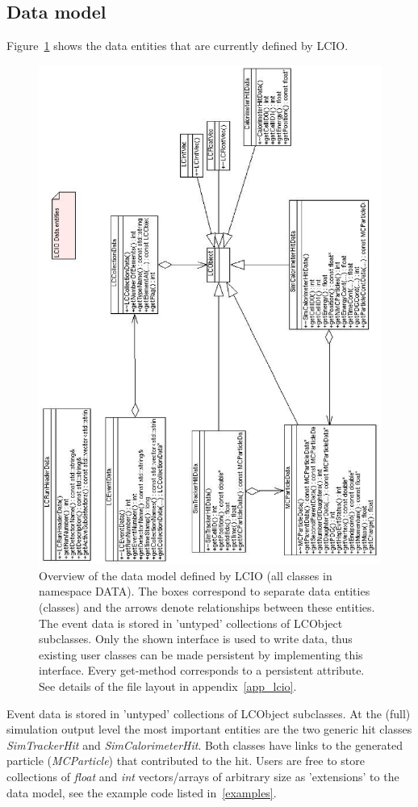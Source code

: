 \documentclass[twoside]{article}
\begin{document}
\subsection{Data model \label{sec_datamodel}}

Figure~\ref{fig_datamodel} shows the data entities that are currently defined by LCIO. 
\begin{figure}
\includegraphics[width=150mm]{datamodel.eps}
\caption{Overview of the data model defined by LCIO (all classes in namespace DATA). 
The boxes correspond to separate
data entities (classes) and the arrows denote relationships between these entities.
The event data is stored in 'untyped' collections of LCObject subclasses.
Only the shown interface is used to write data, thus existing user classes can be made persistent 
by implementing this interface.  Every get-method
corresponds to a persistent attribute. 
See details of the file layout in appendix~\ref{app_lcio}.\label{fig_datamodel}}

\end{figure}
Event data is stored in 'untyped' collections of LCObject subclasses. At the (full) simulation
output level the most important entities are the two generic hit classes {\em SimTrackerHit} and 
{\em SimCalorimeterHit}. Both classes have links to the generated particle ({\em MCParticle}) that 
contributed to the hit.
Users are free to store collections of {\em float} and {\em int} vectors/arrays of arbitrary size
as 'extensions' to the data model, see the example code listed in~\ref{examples}.
\end{document}
